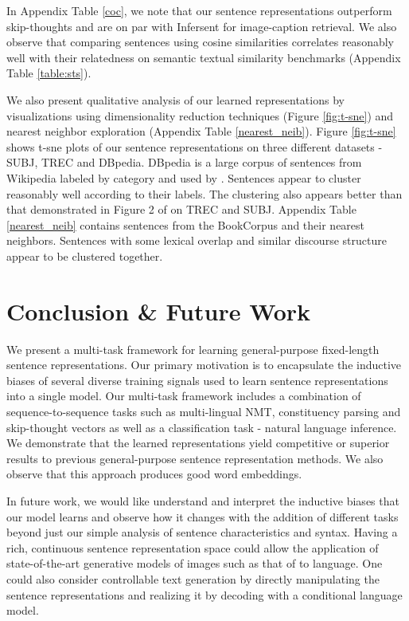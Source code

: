 \documentclass{article} \usepackage{iclr2018_conference,times}
\begin{document}
In Appendix Table \ref{coc}, we note that our sentence representations outperform skip-thoughts and are on par with Infersent for image-caption retrieval. We also observe that comparing sentences using cosine similarities correlates reasonably well with their relatedness on semantic textual similarity benchmarks (Appendix Table \ref{table:sts}).

We also present qualitative analysis of our learned representations by visualizations using dimensionality reduction techniques (Figure \ref{fig:t-sne}) and nearest neighbor exploration (Appendix Table \ref{nearest_neib}). Figure \ref{fig:t-sne} shows t-sne plots of our sentence representations on three different datasets - SUBJ, TREC and DBpedia. DBpedia is a large corpus of sentences from Wikipedia labeled by category and used by \cite{zhang2015character}. Sentences appear to cluster reasonably well according to their labels. The clustering also appears better than that demonstrated in Figure 2 of \cite{kiros2015skip} on TREC and SUBJ. Appendix Table \ref{nearest_neib} contains sentences from the BookCorpus and their nearest neighbors. Sentences with some lexical overlap and similar discourse structure appear to be clustered together.

\section{Conclusion \& Future Work}
We present a multi-task framework for learning general-purpose fixed-length sentence representations. Our primary motivation is to encapsulate the inductive biases of several diverse training signals used to learn sentence representations into a single model. Our multi-task framework includes a combination of sequence-to-sequence tasks such as multi-lingual NMT, constituency parsing and skip-thought vectors as well as a classification task - natural language inference. We demonstrate that the learned representations yield competitive or superior results to previous general-purpose sentence representation methods. We also observe that this approach produces good word embeddings.

In future work, we would like understand and interpret the inductive biases that our model learns and observe how it changes with the addition of different tasks beyond just our simple analysis of sentence characteristics and syntax. Having a rich, continuous sentence representation space could allow the application of state-of-the-art generative models of images such as that of \cite{nguyen2016plug} to language. One could also consider controllable text generation by directly manipulating the sentence representations and realizing it by decoding with a conditional language model.
\end{document}
